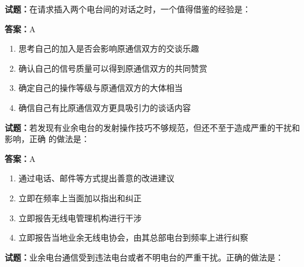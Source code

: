 \documentclass{ctexbook}
\begin{document}




\vspace{1em}

\textbf{试题：}在请求插入两个电台间的对话之时，一个值得借鉴的经验是： 

\textbf{答案：}A 


\begin{enumerate}[leftmargin=3em]
  \item 思考自己的加入是否会影响原通信双方的交谈乐趣 

  \item 确认自己的信号质量可以得到原通信双方的共同赞赏 

  \item 确定自己的操作等级与原通信双方的大体相当 

  \item 确信自己有比原通信双方更具吸引力的谈话内容 

\end{enumerate}





\vspace{1em}

\textbf{试题：}若发现有业余电台的发射操作技巧不够规范，但还不至于造成严重的干扰和影响，正确
的做法是： 

\textbf{答案：}A 

\begin{enumerate}[leftmargin=3em]
  \item 通过电话、邮件等方式提出善意的改进建议 

  \item 立即在频率上当面加以指出和纠正 

  \item 立即报告无线电管理机构进行干涉 

  \item 立即报告当地业余无线电协会，由其总部电台到频率上进行纠察 

\end{enumerate}





\vspace{1em}

\textbf{试题：}业余电台通信受到违法电台或者不明电台的严重干扰。正确的做法是： 
\end{document}
